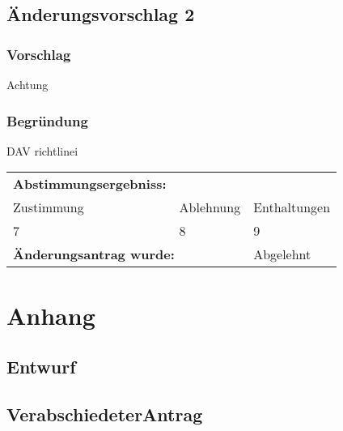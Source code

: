 \documentclass[12pt,a4paper,draft]{scrartcl}
\begin{document}
\subsection{Änderungsvorschlag 2}
\subsubsection*{Vorschlag}
Achtung
\subsubsection*{Begründung}
DAV richtlinei\vspace{1.5ex} \\
\begin{tabularx}{\linewidth}{@{}XXX}
\textbf{Abstimmungsergebniss:}&&\\
Zustimmung & Ablehnung & Enthaltungen \\
7 & 8 & 9 \\
\multicolumn{2}{l}{\textbf{Änderungsantrag wurde:}} & Abgelehnt \\
\end{tabularx}
\appendix
\section*{Anhang}
\subsection*{Entwurf} \label{An:1}
%
\subsection*{VerabschiedeterAntrag} \label{An:2}
%
\end{document}
